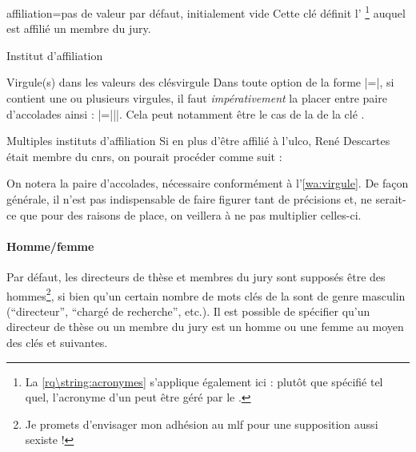 \begin{docKey}{affiliation}{=}{pas de valeur par défaut,
    initialement vide}
  Cette clé définit l'%
    \footnote{La
      \vref{rq\string:acronymes}
      s'applique également ici : plutôt que spécifié tel quel, l'acronyme d'un
       peut être géré par le .}
    auquel est affilié un membre du jury.
\end{docKey}
\begin{dbexample}{Institut d'affiliation}{}
\begin{bodycode}
\end{bodycode}
\end{dbexample}
%
\begin{dbwarning}{Virgule(s) dans les valeurs des clés}{virgule}
  Dans toute option de la forme |=|, si 
  contient une ou plusieurs virgules, il faut \emph{impérativement} la placer
  entre paire d'accolades ainsi : |={||}|. Cela peut
  notamment être le cas de la  de la clé .
\end{dbwarning}
%
\begin{dbexample}{Multiples instituts d'affiliation}{}
  Si en plus d'être affilié à l'\gls{ulco}, René Descartes était membre du
  \gls{cnrs}, on pourait procéder comme suit :
\begin{bodycode}
\end{bodycode}
On notera la paire d'accolades, nécessaire conformément
à l'{\NoAutoSpacing\vref{wa:virgule}}. De façon générale, il n'est pas indispensable de faire
figurer tant de précisions et, ne serait-ce que pour des raisons de place, on
veillera à ne pas multiplier celles-ci.
\end{dbexample}

\paragraph{Homme/femme}
\label{sec-hommefemme}

Par défaut, les directeurs de thèse et membres du jury sont supposés être des
hommes\footnote{Je promets d'envisager mon adhésion au \acrshort{mlf} pour une
  supposition aussi sexiste !}, si bien qu'un certain nombre de mots clés de la
\yatcl{} sont de genre masculin (\enquote{directeur}, \enquote{chargé de
  recherche}, etc.). Il est possible de spécifier qu'un directeur de thèse ou
un membre du jury est un homme ou une femme au moyen des clés  et
 suivantes.

